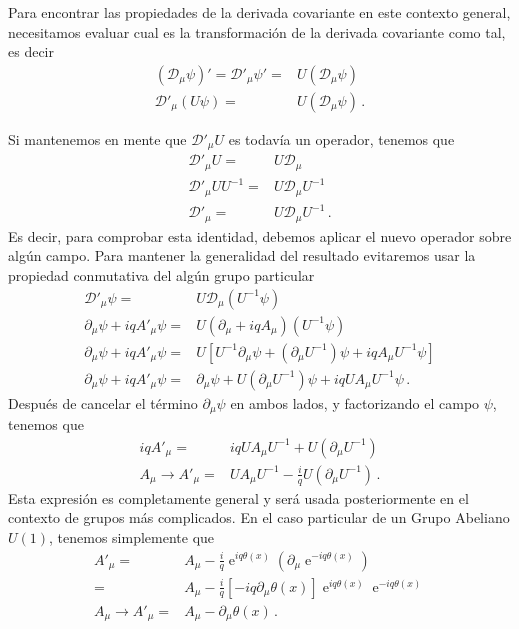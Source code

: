 Para encontrar las propiedades de la derivada covariante en este contexto general, necesitamos evaluar cual es la transformación de la derivada covariante como tal, es decir
\begin{align}
 \left(\mathcal{D}_\mu \psi\right)'=     \mathcal{D}'_\mu \psi'=&U\left(\mathcal{D}_\mu \psi\right)\nonumber\\
    \mathcal{D}'_\mu \left( U\psi \right)=&U\left(\mathcal{D}_\mu \psi\right)\,.
\end{align}

Si mantenemos en mente que  $\mathcal{D}'_\mu U$ es todavía un operador, tenemos que
\begin{align}
    \mathcal{D}'_\mu U=&U\mathcal{D}_\mu \nonumber\\
    \mathcal{D}'_\mu UU^{-1}=&U\mathcal{D}_\mu U^{-1} \nonumber\\
    \mathcal{D}'_\mu =&U\mathcal{D}_\mu U^{-1} \,.
\end{align}
Es decir, para comprobar esta identidad, debemos aplicar el nuevo operador sobre algún campo. Para mantener la generalidad del resultado evitaremos usar la propiedad conmutativa del algún grupo particular
\begin{align*}
    \mathcal{D}'_\mu \psi =&U\mathcal{D}_\mu \left(U^{-1}\psi  \right) \nonumber\\
    \partial_{\mu}\psi+iq A'_{\mu} \psi =&U \left(\partial_{\mu}+iq A_{\mu}  \right) \left(U^{-1}\psi  \right) \nonumber\\
    \partial_{\mu}\psi+iq A'_{\mu} \psi =&U \left[U^{-1}\partial_{\mu}\psi+\left( \partial_{\mu}U^{-1} \right)\psi+iq  A_{\mu}U^{-1}\psi\right] \nonumber\\
    \partial_{\mu}\psi+iq A'_{\mu} \psi =&\partial_{\mu}\psi+U\left( \partial_{\mu}U^{-1} \right)\psi+iq  U A_{\mu}U^{-1}\psi\,.
\end{align*}
Después de cancelar el término  $\partial_{\mu}\psi$ en ambos lados, y factorizando el campo  $\psi$, tenemos que
\begin{align}
      iq A'_{\mu} =&iq  U A_{\mu}U^{-1}+ U\left( \partial_{\mu}U^{-1} \right)\nonumber\\
      A_{\mu}\to A'_{\mu} =&U A_{\mu}U^{-1}-\frac{i}{q}U\left( \partial_{\mu}U^{-1} \right)\,.
\end{align}
Esta expresión es completamente general y será usada posteriormente en el contexto de grupos más complicados. En el caso particular de un Grupo Abeliano  $U(1)$, tenemos simplemente que
\begin{align}
  A'_{\mu}=&A_{\mu}-\frac{i}{q} \operatorname{e}^{iq\theta(x)}\left( \partial_{\mu} \operatorname{e}^{-iq\theta(x)} \right)\nonumber\\
=&A_{\mu}-\frac{i}{q}\left[ -iq\partial_{\mu}\theta(x) \right]\operatorname{e}^{iq\theta(x)} \operatorname{e}^{-iq\theta(x)}\nonumber\\
 A_{\mu}\to  A'_{\mu}=&A_{\mu}-\partial_{\mu}\theta(x)\,.
\end{align}

